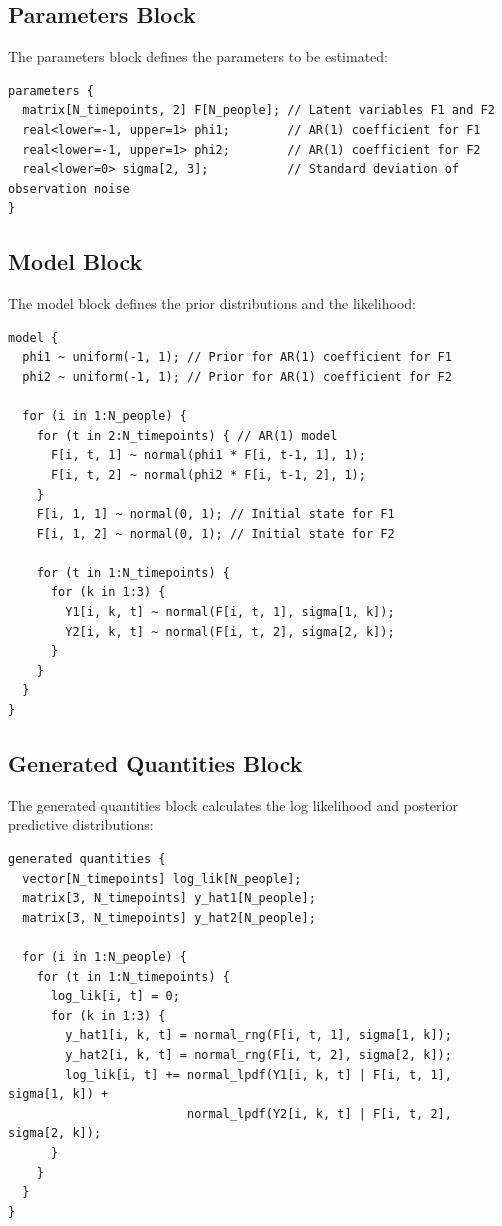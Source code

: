 \documentclass{article}
\begin{document}
\subsection{Parameters Block}
The parameters block defines the parameters to be estimated:
\begin{verbatim}
parameters {
  matrix[N_timepoints, 2] F[N_people]; // Latent variables F1 and F2
  real<lower=-1, upper=1> phi1;        // AR(1) coefficient for F1
  real<lower=-1, upper=1> phi2;        // AR(1) coefficient for F2
  real<lower=0> sigma[2, 3];           // Standard deviation of observation noise
}
\end{verbatim}

\subsection{Model Block}
The model block defines the prior distributions and the likelihood:
\begin{verbatim}
model {
  phi1 ~ uniform(-1, 1); // Prior for AR(1) coefficient for F1
  phi2 ~ uniform(-1, 1); // Prior for AR(1) coefficient for F2

  for (i in 1:N_people) {
    for (t in 2:N_timepoints) { // AR(1) model
      F[i, t, 1] ~ normal(phi1 * F[i, t-1, 1], 1);
      F[i, t, 2] ~ normal(phi2 * F[i, t-1, 2], 1);
    }
    F[i, 1, 1] ~ normal(0, 1); // Initial state for F1
    F[i, 1, 2] ~ normal(0, 1); // Initial state for F2

    for (t in 1:N_timepoints) {
      for (k in 1:3) {
        Y1[i, k, t] ~ normal(F[i, t, 1], sigma[1, k]);
        Y2[i, k, t] ~ normal(F[i, t, 2], sigma[2, k]);
      }
    }
  }
}
\end{verbatim}

\subsection{Generated Quantities Block}
The generated quantities block calculates the log likelihood and posterior predictive distributions:
\begin{verbatim}
generated quantities {
  vector[N_timepoints] log_lik[N_people];
  matrix[3, N_timepoints] y_hat1[N_people];
  matrix[3, N_timepoints] y_hat2[N_people];
  
  for (i in 1:N_people) {
    for (t in 1:N_timepoints) {
      log_lik[i, t] = 0;
      for (k in 1:3) {
        y_hat1[i, k, t] = normal_rng(F[i, t, 1], sigma[1, k]);
        y_hat2[i, k, t] = normal_rng(F[i, t, 2], sigma[2, k]);
        log_lik[i, t] += normal_lpdf(Y1[i, k, t] | F[i, t, 1], sigma[1, k]) +
                         normal_lpdf(Y2[i, k, t] | F[i, t, 2], sigma[2, k]);
      }
    }
  }
}
\end{verbatim}
\end{document}
